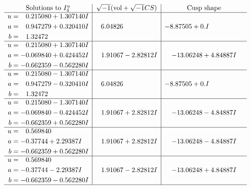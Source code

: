 \documentclass[1p]{elsarticle_modified}
\theoremstyle{definition}
\newcommand{\I}{\sqrt{-1}}
\begin{document}
$$\begin{array}{c|c|c}  
\text{Solutions to }I^u_{4}& \I (\text{vol} + \sqrt{-1}CS) & \text{Cusp shape}\\
 \hline 
\begin{aligned}
u &= \phantom{-}0.215080 + 1.307140 I \\
a &= \phantom{-}0.947279 + 0.320410 I \\
b &= \phantom{-}1.32472\phantom{ +0.000000I}\end{aligned}
 & \phantom{-}6.04826\phantom{ +0.000000I} & -8.87505 + 0. I\phantom{ +0.000000I} \\ \hline\begin{aligned}
u &= \phantom{-}0.215080 + 1.307140 I \\
a &= -0.069840 + 0.424452 I \\
b &= -0.662359 - 0.562280 I\end{aligned}
 & \phantom{-}1.91067 - 2.82812 I & -13.06248 + 4.84887 I \\ \hline\begin{aligned}
u &= \phantom{-}0.215080 - 1.307140 I \\
a &= \phantom{-}0.947279 - 0.320410 I \\
b &= \phantom{-}1.32472\phantom{ +0.000000I}\end{aligned}
 & \phantom{-}6.04826\phantom{ +0.000000I} & -8.87505 + 0. I\phantom{ +0.000000I} \\ \hline\begin{aligned}
u &= \phantom{-}0.215080 - 1.307140 I \\
a &= -0.069840 - 0.424452 I \\
b &= -0.662359 + 0.562280 I\end{aligned}
 & \phantom{-}1.91067 + 2.82812 I & -13.06248 - 4.84887 I \\ \hline\begin{aligned}
u &= \phantom{-}0.569840\phantom{ +0.000000I} \\
a &= -0.37744 + 2.29387 I \\
b &= -0.662359 + 0.562280 I\end{aligned}
 & \phantom{-}1.91067 + 2.82812 I & -13.06248 - 4.84887 I \\ \hline\begin{aligned}
u &= \phantom{-}0.569840\phantom{ +0.000000I} \\
a &= -0.37744 - 2.29387 I \\
b &= -0.662359 - 0.562280 I\end{aligned}
 & \phantom{-}1.91067 - 2.82812 I & -13.06248 + 4.84887 I\\
 \hline 
 \end{array}$$\newpage
\end{document}
